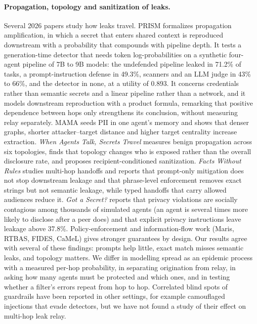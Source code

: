 \documentclass[preprint,12pt,authoryear]{elsarticle}
\begin{document}
\paragraph{Propagation, topology and sanitization of leaks.}
Several 2026 papers study how leaks travel. PRISM \citep{prism2026} formalizes propagation amplification, in which a secret that enters shared context is reproduced downstream with a probability that compounds with pipeline depth. It tests a generation-time detector that needs token log-probabilities on a synthetic four-agent pipeline of 7B to 9B models: the undefended pipeline leaked in 71.2\% of tasks, a prompt-instruction defense in 49.3\%, scanners and an LLM judge in 43\% to 66\%, and the detector in none, at a utility of 0.893. It concerns credentials rather than semantic secrets and a linear pipeline rather than a network, and it models downstream reproduction with a product formula, remarking that positive dependence between hops only strengthens its conclusion, without measuring relay separately. MAMA \citep{liu2026} seeds PII in one agent's memory and shows that denser graphs, shorter attacker--target distance and higher target centrality increase extraction. \emph{When Agents Talk, Secrets Travel} \citep{anon2026a} measures benign propagation across six topologies, finds that topology changes who is exposed rather than the overall disclosure rate, and proposes recipient-conditioned sanitization. \emph{Facts Without Rules} \citep{anon2026b} studies multi-hop handoffs and reports that prompt-only mitigation does not stop downstream leakage and that phrase-level enforcement removes exact strings but not semantic leakage, while typed handoffs that carry allowed audiences reduce it. \emph{Got a Secret?} \citep{anon2026c} reports that privacy violations are socially contagious among thousands of simulated agents (an agent is several times more likely to disclose after a peer does) and that explicit privacy instructions leave leakage above 37.8\%. Policy-enforcement and information-flow work (Maris, RTBAS, FIDES, CaMeL) gives stronger guarantees by design. Our results agree with several of these findings: prompts help little, exact match misses semantic leaks, and topology matters. We differ in modelling spread as an epidemic process with a measured per-hop probability, in separating origination from relay, in asking how many agents must be protected and which ones, and in testing whether a filter's errors repeat from hop to hop. Correlated blind spots of guardrails have been reported in other settings, for example camouflaged injections that evade detectors, but we have not found a study of their effect on multi-hop leak relay.
\end{document}
